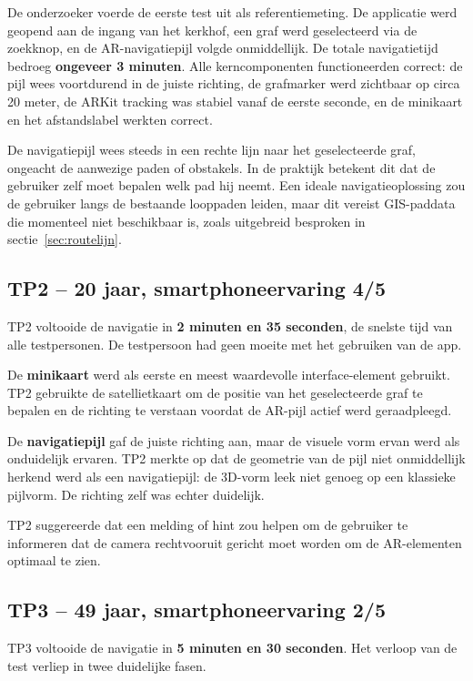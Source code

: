 De onderzoeker voerde de eerste test uit als referentiemeting. De applicatie
werd geopend aan de ingang van het kerkhof, een graf werd geselecteerd via de
zoekknop, en de AR-navigatiepijl volgde onmiddellijk. De totale navigatietijd
bedroeg \textbf{ongeveer 3 minuten}. Alle kerncomponenten functioneerden
correct: de pijl wees voortdurend in de juiste richting, de grafmarker werd
zichtbaar op circa 20 meter, de ARKit tracking was stabiel vanaf de eerste
seconde, en de minikaart en het afstandslabel werkten correct.

De navigatiepijl wees steeds in een rechte lijn naar het geselecteerde graf,
ongeacht de aanwezige paden of obstakels. In de praktijk betekent dit dat de
gebruiker zelf moet bepalen welk pad hij neemt. Een ideale navigatieoplossing
zou de gebruiker langs de bestaande looppaden leiden, maar dit vereist
GIS-paddata die momenteel niet beschikbaar is, zoals uitgebreid besproken in
sectie~\ref{sec:routelijn}.

\subsection{TP2 -- 20 jaar, smartphoneervaring 4/5}

TP2 voltooide de navigatie in \textbf{2 minuten en 35 seconden}, de snelste
tijd van alle testpersonen. De testpersoon had geen moeite met het gebruiken van de app.

De \textbf{minikaart} werd als eerste en meest waardevolle interface-element
gebruikt. TP2 gebruikte de satellietkaart om de positie van het geselecteerde
graf te bepalen en de richting te verstaan voordat de AR-pijl actief werd
geraadpleegd.

De \textbf{navigatiepijl} gaf de juiste richting aan, maar de visuele vorm
ervan werd als onduidelijk ervaren. TP2 merkte op dat de geometrie van de pijl
niet onmiddellijk herkend werd als een navigatiepijl: de 3D-vorm leek niet
genoeg op een klassieke pijlvorm. De richting zelf was echter duidelijk.

TP2 suggereerde dat een melding of hint zou helpen om de gebruiker te informeren
dat de camera rechtvooruit gericht moet worden om de AR-elementen optimaal te zien.

\subsection{TP3 -- 49 jaar, smartphoneervaring 2/5}

TP3 voltooide de navigatie in \textbf{5 minuten en 30 seconden}. Het verloop
van de test verliep in twee duidelijke fasen.

